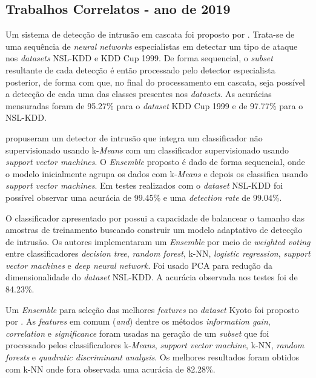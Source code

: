 \subsection{Trabalhos Correlatos - ano de 2019}
\label{trab_correlatos_19}


Um sistema de detecção de intrusão em cascata foi proposto por . Trata-se de uma sequência de \textit{neural networks} especialistas em detectar um tipo de ataque nos \textit{datasets} NSL-KDD e KDD Cup 1999. De forma sequencial, o \textit{subset} resultante de cada detecção é então processado pelo detector especialista posterior, de forma com que, no final do processamento em cascata, seja possível a detecção de cada uma das classes presentes nos \textit{datasets}. As acurácias mensuradas foram de 95.27\% para o \textit{dataset} KDD Cup 1999 e de 97.77\% para o NSL-KDD.

 propuseram um detector de intrusão que integra um classificador não supervisionado usando k-\textit{Means} com um classificador supervisionado usando \textit{support vector machines}. O \textit{Ensemble} proposto é dado de forma sequencial, onde o modelo inicialmente agrupa os dados com k-\textit{Means} e depois os classifica usando \textit{support vector machines}. Em testes realizados com o \textit{dataset} NSL-KDD foi possível observar uma acurácia de 99.45\% e uma \textit{detection rate} de 99.04\%.

O classificador apresentado por  possui a capacidade de balancear o tamanho das amostras de treinamento buscando construir um modelo adaptativo de detecção de intrusão. Os autores implementaram um \textit{Ensemble} por meio de \textit{weighted voting} entre  classificadores \textit{decision tree}, \textit{random forest}, k-NN, \textit{logistic regression}, \textit{support vector machines} e \textit{deep neural network}. Foi usado PCA para redução da dimensionalidade do \textit{dataset} NSL-KDD. A acurácia observada nos testes foi de 84.23\%.


Um \textit{Ensemble} para seleção das melhores \textit{features} no \textit{dataset} Kyoto foi proposto por . As \textit{features} em comum (\textit{and}) dentre os métodos \textit{information gain}, \textit{correlation} e \textit{significance} foram usadas na geração de um \textit{subset} que foi processado pelos classificadores k-\textit{Means}, \textit{support vector machine}, k-NN, \textit{random forests} e \textit{quadratic discriminant analysis}. Os melhores resultados foram obtidos com k-NN onde fora observada uma acurácia de 82.28\%.

